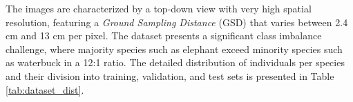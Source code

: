 The images are characterized by a top-down view with very high spatial resolution, featuring a \textit{Ground Sampling Distance} (GSD) that varies between 2.4 cm and 13 cm per pixel. The dataset presents a significant class imbalance challenge, where majority species such as elephant exceed minority species such as waterbuck in a 12:1 ratio. The detailed distribution of individuals per species and their division into training, validation, and test sets is presented in Table \ref{tab:dataset_dist}.

\begin{table}[ht]
\centering
\caption{Distribution of individuals per species in the training, validation, and test sets.}
\label{tab:dataset_dist}
\end{table}


